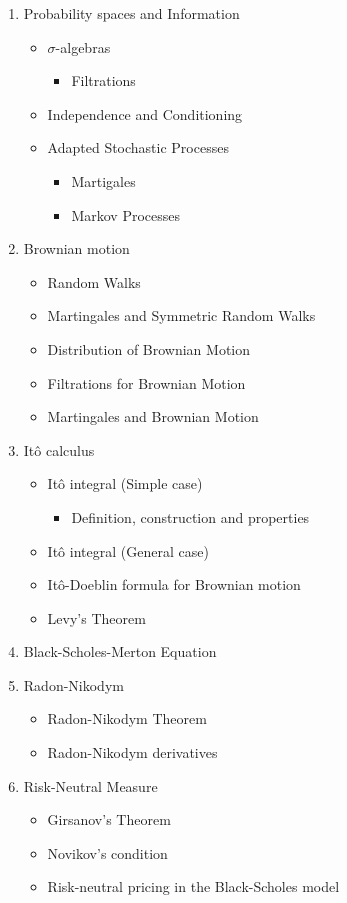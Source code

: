 \documentclass[reqno,a4paper,12pt]{amsart}%
\numberwithin{equation}{section}
\theoremstyle{definition}
\begin{document}
\begin{enumerate}
	\item Probability spaces and Information
	\begin{itemize}
		\item $\sigma$-algebras
		\begin{itemize}
			\item Filtrations
		\end{itemize}
		\item Independence and Conditioning
		\item Adapted Stochastic Processes
		\begin{itemize}
			\item Martigales
			\item Markov Processes
		\end{itemize}
	\end{itemize}
	\item Brownian motion
	\begin{itemize}
		\item Random Walks
		\item Martingales and Symmetric Random Walks
		\item Distribution of Brownian Motion
		\item Filtrations for Brownian Motion
		\item Martingales and Brownian Motion
	\end{itemize}
	\item It\^{o} calculus
	\begin{itemize}
		\item It\^{o} integral (Simple case)
		\begin{itemize}
			\item Definition, construction and properties
		\end{itemize}
		\item It\^{o} integral (General case)
		\item It\^{o}-Doeblin formula for Brownian motion
		\item Levy's Theorem
	\end{itemize}
	\item Black-Scholes-Merton Equation 
	\item Radon-Nikodym 
	\begin{itemize}
		\item Radon-Nikodym Theorem
		\item Radon-Nikodym derivatives
	\end{itemize}
	\item Risk-Neutral Measure
	\begin{itemize}
		\item Girsanov's Theorem
		\item Novikov's condition
		\item Risk-neutral pricing in the Black-Scholes model
	\end{itemize}
\end{enumerate}
	 
\end{document}
